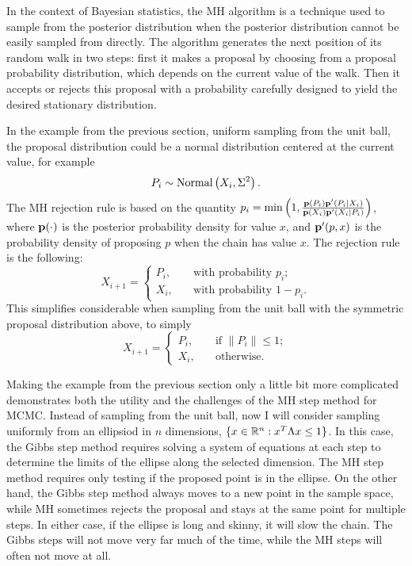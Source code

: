 In the context of Bayesian statistics, the MH
algorithm is a technique used to sample from the posterior
distribution when the posterior distribution cannot be easily sampled
from directly. The algorithm generates the next position of its random walk
in two steps: first it makes a proposal by choosing from a proposal
probability distribution, which depends on the current value of the
walk. Then it accepts or rejects this proposal with a probability
carefully designed to yield the desired stationary distribution.

In the example from the previous section, uniform sampling from the
unit ball, the proposal distribution could be a normal distribution centered at the current value, for example
\[
P_i \sim \operatorname{Normal}\left(X_i, \Sigma^2\right).
\]
The MH rejection rule is based on the quantity $p_i =
\min\left(1, \frac{\mathbf{p}(P_i)\mathbf{p}'(P_i|X_i)}{\mathbf{p}(X_i)\mathbf{p}'(X_i|P_i)}\right)$, where
$\mathbf{p}(\cdot)$ is the posterior probability density for value $x$, and
$\mathbf{p}'(p, x)$ is the probability density of proposing $p$ when the
chain has value $x$.  The rejection rule is the following:
\[
X_{i+1} = \begin{cases}
P_i, &\quad\text{with probability } p_i;\\
X_i, &\quad\text{with probability } 1-p_i.
\end{cases}
\]
This simplifies considerable when sampling from the unit ball with the
symmetric proposal distribution above, to simply
\[
X_{i+1} = \begin{cases}
P_i , &\quad\text{if }\|P_i\| \leq 1;\\
X_i, &\quad\text{otherwise}.
\end{cases}
\]

Making the example from the previous section only a little bit more
complicated demonstrates both the utility and the challenges of the MH
step method for MCMC.  Instead of sampling from the unit ball, now I
will consider sampling uniformly from an ellipsiod in $n$ dimensions,
$\{x\in \mathbb{R}^n : x^T \Lambda x \leq 1\}$.  In this case, the Gibbs
step method requires solving a system of equations at each step to
determine the limits of the ellipse along the selected dimension.  The
MH step method requires only testing if the proposed point is in the
ellipse.  On the other hand, the Gibbs step method always moves to a
new point in the sample space, while MH sometimes rejects the proposal
and stays at the same point for multiple steps.  In either case, if
the ellipse is long and skinny, it will slow the chain.  The Gibbs
steps will not move very far much of the time, while the MH steps will
often not move at all.

